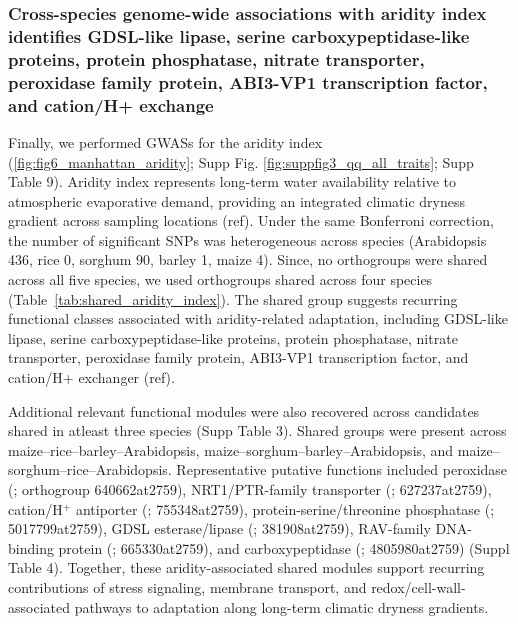 \documentclass[unnumsec,webpdf,contemporary,large]{oup-authoring-template}%
\theoremstyle{thmstyleone}%
\theoremstyle{thmstyletwo}%
\theoremstyle{thmstylethree}%
\begin{document}
\begin{table}[t]
\begin{tabular*}{\textwidth}{@{\extracolsep{\fill}}lllllll@{}}
\bottomrule
\end{tabular*}
\end{table}


\subsubsection{Cross-species genome-wide associations with aridity index identifies GDSL-like lipase, serine carboxypeptidase-like proteins, protein phosphatase, nitrate transporter, peroxidase family protein, ABI3-VP1 transcription factor, and cation/H+ exchange}

Finally, we performed GWASs for the aridity index (\ref{fig:fig6_manhattan_aridity}; Supp Fig. \ref{fig:suppfig3_qq_all_traits}; Supp Table 9). Aridity index represents long-term water availability relative to atmospheric evaporative demand, providing an integrated climatic dryness gradient across sampling locations (ref). Under the same Bonferroni correction, the number of significant SNPs was heterogeneous across species (Arabidopsis 436, rice 0, sorghum 90, barley 1, maize 4). Since, no orthogroups were shared across all five species, we used orthogroups shared across four species (Table~\ref{tab:shared_aridity_index}). The shared group suggests recurring functional classes associated with aridity-related adaptation, including GDSL-like lipase, serine carboxypeptidase-like proteins, protein phosphatase, nitrate transporter, peroxidase family protein, ABI3-VP1 transcription factor, and cation/H+ exchanger (ref).

Additional relevant functional modules were also recovered across candidates shared in atleast three species (Supp Table 3). Shared groups were present across maize--rice--barley--Arabidopsis, maize--sorghum--barley--Arabidopsis, and maize--sorghum--rice--Arabidopsis. Representative putative functions included peroxidase (\textit{}; orthogroup 640662at2759), NRT1/PTR-family transporter (\textit{}; 627237at2759), cation/H$^{+}$ antiporter (\textit{}; 755348at2759), protein-serine/threonine phosphatase (\textit{}; 5017799at2759), GDSL esterase/lipase (\textit{}; 381908at2759), RAV-family DNA-binding protein (\textit{}; 665330at2759), and carboxypeptidase (\textit{}; 4805980at2759) (Suppl Table 4). Together, these aridity-associated shared modules support recurring contributions of stress signaling, membrane transport, and redox/cell-wall-associated pathways to adaptation along long-term climatic dryness gradients.
\end{document}
